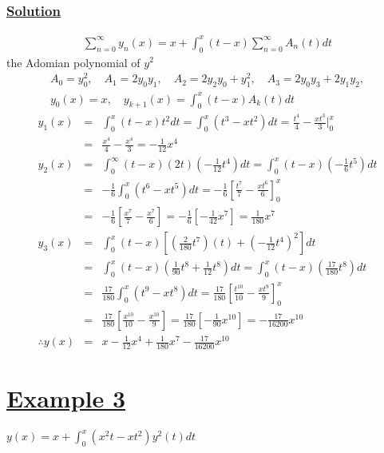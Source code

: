 \documentclass[11pt]{report}
\newcommand{\ubt}[1]{\textbf{\underline{#1}}}
\newcommand{\sps}{\\[0.2cm]}
\newcommand{\dsp}{\displaystyle}
\newcommand{\example}[1]{\section*{\ubt{Example #1}}}
\newcommand{\solution}{\subsubsection{\ubt{Solution}}}
\begin{document}
		\solution
		\begin{eqnarray*}
			\sum_{n=0}^\infty y_n(x) = x + \int_0^x (t-x)\sum_{n=0}^\infty A_n(t) dt
		\end{eqnarray*}
		the Adomian polynomial of $y^2$
		\begin{gather*}
			A_0 = y_0^2,\quad A_1=2y_0y_1,\quad A_2=2y_2y_0 + y_1^2,\quad A_3=2y_0y_3 + 2y_1y_2,\sps 
			y_0(x)=x,\quad y_{k+1}(x) = \int_0^x(t-x)A_k(t)dt
		\end{gather*}
		\begin{eqnarray*}
			y_1(x) &=&\int_0^x(t-x)t^2dt = \int_0^x(t^3-xt^2)dt = \frac{t^4}{4} - \frac{xt^3}{3}\Bigg|_0^x\sps
			&=& \frac{x^4}{4} - \frac{x^4}{3} = - \frac{1}{12}x^4\sps
			y_2(x) &=&\int_0^\infty(t-x)(2t)\left(-\frac{1}{12}t^4\right)dt = \int_0^x(t-x)\left(-\frac{1}{6}t^5\right)dt\sps
			&=& -\frac{1}{6}\int_0^x(t^6 - xt^5)dt = -\frac{1}{6}\left[\frac{t^7}{7} - \frac{xt^6}{6}\right]_0^x\sps
			&=& - \frac{1}{6}\left[\frac{x^7}{7} - \frac{x^7}{6}\right] = -\frac{1}{6}\left[-\frac{1}{42}x^7\right]= \frac{1}{180}x^7\sps
			y_3(x) &=&\int_0^x(t-x)\left[\left(\frac{2}{180}t^7\right)(t) + \left(-\frac{1}{12}t^4\right)^2\right] dt\sps
			&=&\int_0^x(t-x)\left(\frac{1}{90}t^8 + \frac{1}{12}t^8\right) dt = \int_0^x(t-x)\left(\frac{17}{180}t^8\right)dt\sps
			&=& \frac{17}{180}\int_0^x(t^9 - xt^8)dt = \frac{17}{180}\left[\frac{t^10}{10} - \frac{xt^9}{9}\right]_0^x\sps
			&=&\frac{17}{180}\left[\frac{x^{10}}{10} - \frac{x^{10}}{9}\right] = \frac{17}{180}\left[-\frac{1}{90}x^{10}\right] = -\frac{17}{16200}x^{10}\sps
			\therefore y(x) &=& x - \frac{1}{12}x^4 + \frac{1}{180}x^7 - \frac{17}{16200}x^{10}
		\end{eqnarray*}
		
		\example{3}
		$\dsp y(x) = x + \int_0^x (x^2 t - xt^2) y^2(t)dt$
		
\end{document}
